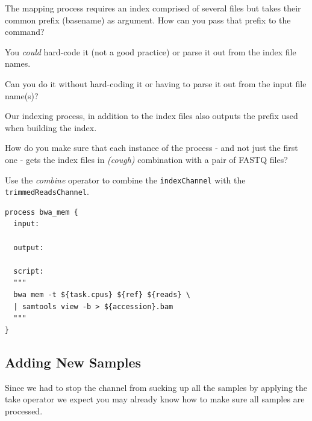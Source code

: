 \begin{questions}
The mapping process requires an index comprised of several files but takes their common prefix (basename) 
as argument. How can you pass that prefix to the command?\\
\begin{answer}
You \emph{could} hard-code it (not a good practice) or parse it out from the index file names. 
\end{answer}
Can you do it without hard-coding it or having to parse it out from the input file name(s)?\\
\begin{answer}
Our indexing process, in addition to the index files also outputs the prefix used when building the index. \\
\end{answer}
How do you make sure that each instance of the process - and not just the first one - gets the index files in \emph{(cough)} combination with a pair of FASTQ files?\\
\begin{answer}
Use the \emph{combine} operator to combine the \texttt{indexChannel} with the \texttt{trimmedReadsChannel}.
\begin{lstlisting}
process bwa_mem {
  input:
    
  output:
    
  script:
  """
  bwa mem -t ${task.cpus} ${ref} ${reads} \
  | samtools view -b > ${accession}.bam
  """
}
\end{lstlisting}
\end{answer}
\begin{answer}
\end{answer}
\end{questions}


\subsection{Adding New Samples}

Since we had to stop the channel from sucking up all the samples by applying the take operator 
we expect you may already know how to make sure all samples are processed.




%




